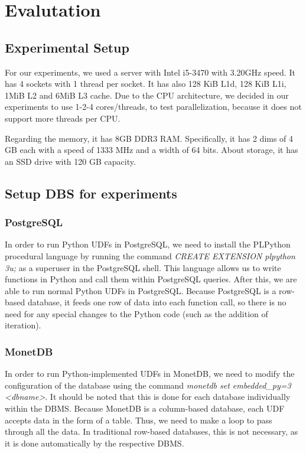 \section{Evalutation}
\label{sec:experiments}

\subsection{Experimental Setup}
For our experiments, we used a server with Intel i5-3470 with 3.20GHz speed. It has 4 sockets with 1 thread per socket. 
It has also 128 KiB L1d, 128 KiB L1i, 1MiB L2 and 6MiB L3 cache. Due to the CPU architecture, 
we decided in our experiments to use 1-2-4 cores/threads, 
to test parallelization, because it does not support more threads per CPU.

Regarding the memory, it has 8GB DDR3 RAM. Specifically, it has 2 dims of 4 GB each with a speed of 1333 MHz and a width of 64 bits. 
About storage, it has an SSD drive with 120 GB capacity.

\subsection{Setup DBS for experiments}
\subsubsection{PostgreSQL}
In order to run Python UDFs in PostgreSQL, we need to install the PL\/Python 
procedural language by running the command \emph{CREATE EXTENSION plpython
3u;} as a superuser in the PostgreSQL shell. 
This language allows us to write functions in Python and call them within
PostgreSQL queries. After this, we are able to run normal Python UDFs in
PostgreSQL. 
Because PostgreSQL is a row-based database, it feeds one row of data into 
each function call, so there is no need for any special changes to the 
Python code (such as the addition of iteration).

\subsubsection{MonetDB}
In order to run Python-implemented UDFs in MonetDB, we need to modify the 
configuration of the database using the command 
\emph{monetdb set embedded\_py=3 <dbname>}. 
It should be noted that this is done for each database individually within
the DBMS. Because MonetDB is a column-based database, each UDF accepts data
in the form of a table. 
Thus, we need to make a loop to pass through all the data. In traditional
row-based databases, this is not necessary, as it is done automatically by the respective DBMS.


